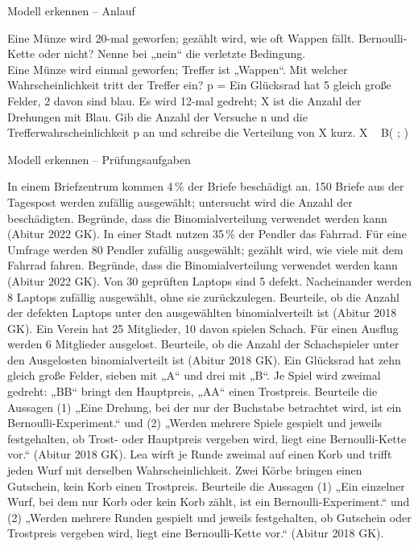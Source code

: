\setcounter{aufgabe}{42}

\begin{aufgabe}{Modell erkennen – Anlauf}
\begin{teile}
\teil Eine Münze wird 20-mal geworfen; gezählt wird, wie oft Wappen fällt. Bernoulli-Kette oder nicht? Nenne bei „nein“ die verletzte Bedingung.  \\ 
\teil Eine Münze wird einmal geworfen; Treffer ist „Wappen“. Mit welcher Wahrscheinlichkeit tritt der Treffer ein? p = \leerfeld
\teil Ein Glücksrad hat 5 gleich große Felder, 2 davon sind blau. Es wird 12-mal gedreht; X ist die Anzahl der Drehungen mit Blau. Gib die Anzahl der Versuche n und die Trefferwahrscheinlichkeit p an und schreibe die Verteilung von X kurz. X ~ B( \leerfeld ; \leerfeld )
\end{teile}
\end{aufgabe}

\begin{aufgabe}{Modell erkennen – Prüfungsaufgaben}
\begin{teile}
\teil In einem Briefzentrum kommen 4\,\% der Briefe beschädigt an. 150 Briefe aus der Tagespost werden zufällig ausgewählt; untersucht wird die Anzahl der beschädigten. Begründe, dass die Binomialverteilung verwendet werden kann \hfill (Abitur 2022 GK).
\teil In einer Stadt nutzen 35\,\% der Pendler das Fahrrad. Für eine Umfrage werden 80 Pendler zufällig ausgewählt; gezählt wird, wie viele mit dem Fahrrad fahren. Begründe, dass die Binomialverteilung verwendet werden kann \hfill (Abitur 2022 GK).
\teil Von 30 geprüften Laptops sind 5 defekt. Nacheinander werden 8 Laptops zufällig ausgewählt, ohne sie zurückzulegen. Beurteile, ob die Anzahl der defekten Laptops unter den ausgewählten binomialverteilt ist \hfill (Abitur 2018 GK).
\teil Ein Verein hat 25 Mitglieder, 10 davon spielen Schach. Für einen Ausflug werden 6 Mitglieder ausgelost. Beurteile, ob die Anzahl der Schachspieler unter den Ausgelosten binomialverteilt ist \hfill (Abitur 2018 GK).
\teil Ein Glücksrad hat zehn gleich große Felder, sieben mit „A“ und drei mit „B“. Je Spiel wird zweimal gedreht: „BB“ bringt den Hauptpreis, „AA“ einen Trostpreis. Beurteile die Aussagen (1) „Eine Drehung, bei der nur der Buchstabe betrachtet wird, ist ein Bernoulli-Experiment.“ und (2) „Werden mehrere Spiele gespielt und jeweils festgehalten, ob Trost- oder Hauptpreis vergeben wird, liegt eine Bernoulli-Kette vor.“ \hfill (Abitur 2018 GK).
\teil Lea wirft je Runde zweimal auf einen Korb und trifft jeden Wurf mit derselben Wahrscheinlichkeit. Zwei Körbe bringen einen Gutschein, kein Korb einen Trostpreis. Beurteile die Aussagen (1) „Ein einzelner Wurf, bei dem nur Korb oder kein Korb zählt, ist ein Bernoulli-Experiment.“ und (2) „Werden mehrere Runden gespielt und jeweils festgehalten, ob Gutschein oder Trostpreis vergeben wird, liegt eine Bernoulli-Kette vor.“ \hfill (Abitur 2018 GK).
\end{teile}
\end{aufgabe}


